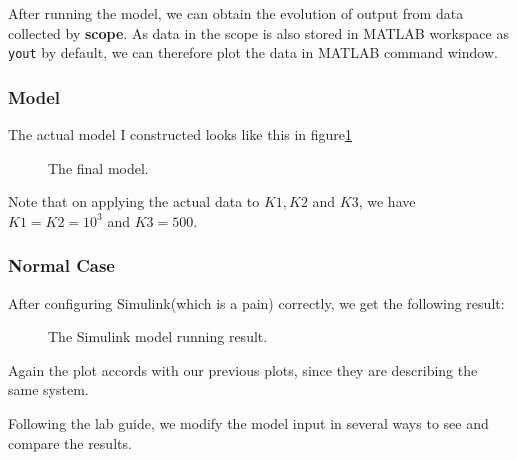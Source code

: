 \documentclass{article}
\begin{document}
  After running the model, we can obtain the evolution of output from data collected by \textbf{scope}. As data in the scope is also stored in MATLAB workspace as \verb+yout+ by default, we can therefore plot the data in MATLAB command window.
  \subsubsection{Model}
  The actual model I constructed looks like this in figure\ref{fig:md}
  \begin{figure}[H]
    \centering
    \noindent{}
    \caption{The final model.} \label{fig:md}
  \end{figure}\par
  Note that on applying the actual data to $K1, K2$ and $K3$, we have $K1 = K2 = 10^3$ and $K3 = 500$.
  
  \subsubsection{Normal Case}
  After configuring Simulink(which is a pain) correctly, we get the following result:
  \begin{figure}[H]
    \centering
    \noindent{}
    \caption{The Simulink model running result.} \label{fig:sm1}
  \end{figure}
  Again the plot accords with our previous plots, since they are describing the same system.\par
  Following the lab guide, we modify the model input in several ways to see and compare the results. \par
  
\end{document}
